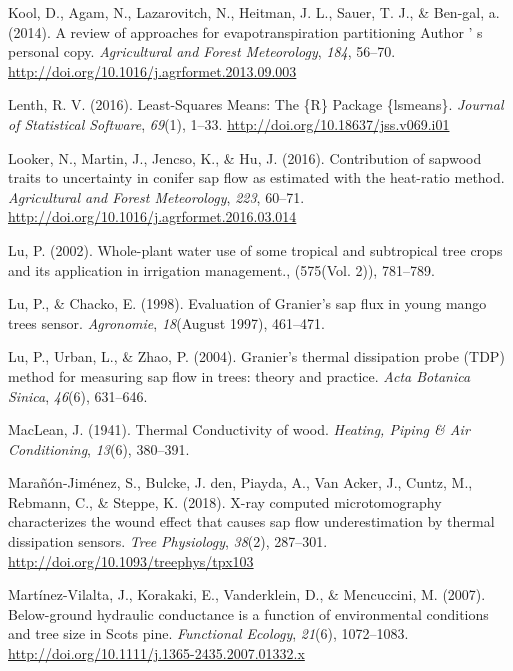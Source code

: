 \documentclass[11pt,twoside]{reedthesis}
\begin{document}
\hypertarget{ref-Kool2014}{}
Kool, D., Agam, N., Lazarovitch, N., Heitman, J. L., Sauer, T. J., \&
Ben-gal, a. (2014). A review of approaches for evapotranspiration
partitioning Author ' s personal copy. \emph{Agricultural and Forest
Meteorology}, \emph{184}, 56--70.
\url{http://doi.org/10.1016/j.agrformet.2013.09.003}

\hypertarget{ref-Lenth2016}{}
Lenth, R. V. (2016). Least-Squares Means: The \{R\} Package \{lsmeans\}.
\emph{Journal of Statistical Software}, \emph{69}(1), 1--33.
\url{http://doi.org/10.18637/jss.v069.i01}

\hypertarget{ref-Looker2016}{}
Looker, N., Martin, J., Jencso, K., \& Hu, J. (2016). Contribution of
sapwood traits to uncertainty in conifer sap flow as estimated with the
heat-ratio method. \emph{Agricultural and Forest Meteorology},
\emph{223}, 60--71. \url{http://doi.org/10.1016/j.agrformet.2016.03.014}

\hypertarget{ref-Lu2002}{}
Lu, P. (2002). Whole-plant water use of some tropical and subtropical
tree crops and its application in irrigation management., (575(Vol. 2)),
781--789.

\hypertarget{ref-Lu1998}{}
Lu, P., \& Chacko, E. (1998). Evaluation of Granier's sap flux in young
mango trees sensor. \emph{Agronomie}, \emph{18}(August 1997), 461--471.

\hypertarget{ref-Lu2004}{}
Lu, P., Urban, L., \& Zhao, P. (2004). Granier's thermal dissipation
probe (TDP) method for measuring sap flow in trees: theory and practice.
\emph{Acta Botanica Sinica}, \emph{46}(6), 631--646.

\hypertarget{ref-MacLean1941}{}
MacLean, J. (1941). Thermal Conductivity of wood. \emph{Heating, Piping
\& Air Conditioning}, \emph{13}(6), 380--391.

\hypertarget{ref-Maranon-jimenez2018}{}
Marañón-Jiménez, S., Bulcke, J. den, Piayda, A., Van Acker, J., Cuntz,
M., Rebmann, C., \& Steppe, K. (2018). X-ray computed microtomography
characterizes the wound effect that causes sap flow underestimation by
thermal dissipation sensors. \emph{Tree Physiology}, \emph{38}(2),
287--301. \url{http://doi.org/10.1093/treephys/tpx103}

\hypertarget{ref-Martinez-Vilalta2007}{}
Martínez-Vilalta, J., Korakaki, E., Vanderklein, D., \& Mencuccini, M.
(2007). Below-ground hydraulic conductance is a function of
environmental conditions and tree size in Scots pine. \emph{Functional
Ecology}, \emph{21}(6), 1072--1083.
\url{http://doi.org/10.1111/j.1365-2435.2007.01332.x}
\end{document}
